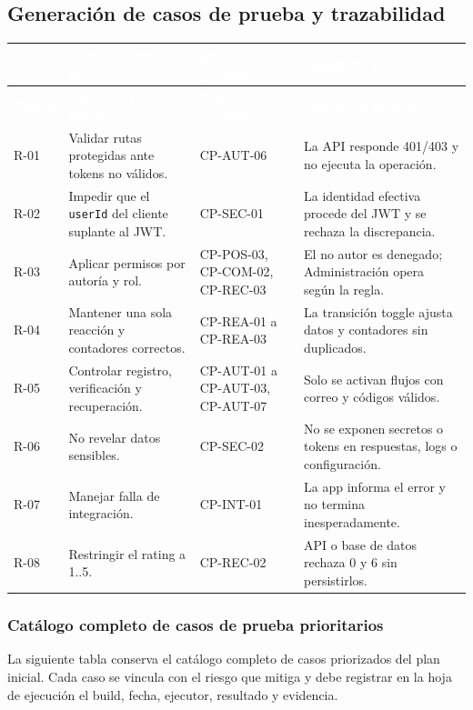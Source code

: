 \documentclass[11pt,a4paper]{article}
\newcommand{\thead}[1]{\textcolor{white}{\textbf{#1}}}
\begin{document}
\subsection{Generación de casos de prueba y trazabilidad}
\footnotesize
\begin{longtable}{p{1.0cm}p{3.6cm}p{3.0cm}p{5.0cm}}
\rowcolor{uniwayblue}\thead{Riesgo} & \thead{Condición de prueba} & \thead{Caso principal} & \thead{Resultado esperado}\\
\endfirsthead
\rowcolor{uniwayblue}\thead{Riesgo} & \thead{Condición de prueba} & \thead{Caso principal} & \thead{Resultado esperado}\\
\endhead
R-01 & Validar rutas protegidas ante tokens no válidos. & CP-AUT-06 & La API responde 401/403 y no ejecuta la operación.\\
\rowcolor{lightgray}R-02 & Impedir que el \texttt{userId} del cliente suplante al JWT. & CP-SEC-01 & La identidad efectiva procede del JWT y se rechaza la discrepancia.\\
R-03 & Aplicar permisos por autoría y rol. & CP-POS-03, CP-COM-02, CP-REC-03 & El no autor es denegado; Administración opera según la regla.\\
\rowcolor{lightgray}R-04 & Mantener una sola reacción y contadores correctos. & CP-REA-01 a CP-REA-03 & La transición toggle ajusta datos y contadores sin duplicados.\\
R-05 & Controlar registro, verificación y recuperación. & CP-AUT-01 a CP-AUT-03, CP-AUT-07 & Solo se activan flujos con correo y códigos válidos.\\
\rowcolor{lightgray}R-06 & No revelar datos sensibles. & CP-SEC-02 & No se exponen secretos o tokens en respuestas, logs o configuración.\\
R-07 & Manejar falla de integración. & CP-INT-01 & La app informa el error y no termina inesperadamente.\\
\rowcolor{lightgray}R-08 & Restringir el rating a 1..5. & CP-REC-02 & API o base de datos rechaza 0 y 6 sin persistirlos.\\
\end{longtable}
\normalsize

\subsubsection{Catálogo completo de casos de prueba prioritarios}
La siguiente tabla conserva el catálogo completo de casos priorizados del plan inicial. Cada caso se vincula con el riesgo que mitiga y debe registrar en la hoja de ejecución el build, fecha, ejecutor, resultado y evidencia.
\end{document}
